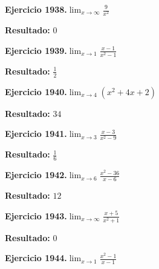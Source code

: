 \documentclass[10pt,a4paper]{article}
\begin{document}
\begin{ejbox}
\textbf{Ejercicio 1938.}\quad $\lim_{x\to \infty} \frac{9}{x^2}$
\end{ejbox}

\begin{solbox}
\textbf{Resultado:} \(\displaystyle 0\)
\end{solbox}

\newpage
\begin{ejbox}
\textbf{Ejercicio 1939.}\quad $\lim_{x\to 1} \frac{x-1}{x^2-1}$
\end{ejbox}

\begin{solbox}
\textbf{Resultado:} \(\displaystyle \frac{1}{2}\)
\end{solbox}

\begin{ejbox}
\textbf{Ejercicio 1940.}\quad $\lim_{x\to 4} (x^2 +4x +2)$
\end{ejbox}

\begin{solbox}
\textbf{Resultado:} \(\displaystyle 34\)
\end{solbox}

\begin{ejbox}
\textbf{Ejercicio 1941.}\quad $\lim_{x\to 3} \frac{x-3}{x^2-9}$
\end{ejbox}

\begin{solbox}
\textbf{Resultado:} \(\displaystyle \frac{1}{6}\)
\end{solbox}

\newpage
\begin{ejbox}
\textbf{Ejercicio 1942.}\quad $\lim_{x\to 6} \frac{x^2-36}{x-6}$
\end{ejbox}

\begin{solbox}
\textbf{Resultado:} \(\displaystyle 12\)
\end{solbox}

\begin{ejbox}
\textbf{Ejercicio 1943.}\quad $\lim_{x\to \infty} \frac{x + 5}{x^2 + 1}$
\end{ejbox}

\begin{solbox}
\textbf{Resultado:} \(\displaystyle 0\)
\end{solbox}

\begin{ejbox}
\textbf{Ejercicio 1944.}\quad $\lim_{x\to 1} \frac{x^2-1}{x-1}$
\end{ejbox}
\end{document}

